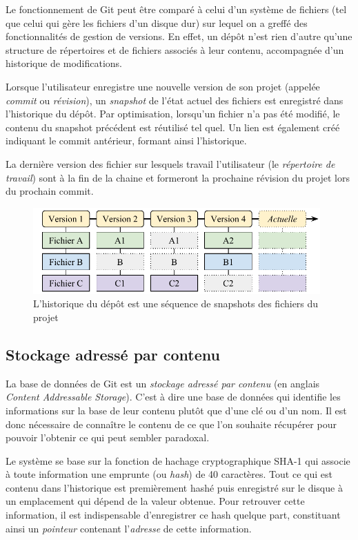 \documentclass[11pt,a4paper]{article}
\begin{document}
Le fonctionnement de Git peut être comparé à celui d'un système de fichiers (tel que celui qui gère les fichiers d'un disque dur) sur lequel on a greffé des fonctionnalités de gestion de versions.
En effet, un dépôt n'est rien d'autre qu'une structure de répertoires et de fichiers associés à leur contenu, accompagnée d'un historique de modifications.

Lorsque l'utilisateur enregistre une nouvelle version de son projet (appelée \textit{commit} ou \textit{révision}), un \textit{snapshot} de l'état actuel des fichiers est enregistré dans l'historique du dépôt.
Par optimisation, lorsqu'un fichier n'a pas été modifié, le contenu du snapshot précédent est réutilisé tel quel. Un lien est également créé indiquant le commit antérieur, formant ainsi l'historique.

La dernière version des fichier sur lesquels travail l'utilisateur (le \textit{répertoire de travail}) sont à la fin de la chaine et formeront la prochaine révision du projet lors du prochain commit.

\begin{figure}[ht]
\begin{center}
\includegraphics[width=11cm]{img_snapshots}
\caption{L'historique du dépôt est une séquence de snapshots des fichiers du projet}
\end{center}
\end{figure}

\subsection{Stockage adressé par contenu}

La base de données de Git est un \textit{stockage adressé par contenu} (en anglais \textit{Content Addressable Storage}). C'est à dire une base de données qui identifie les informations sur la base de leur contenu plutôt que d'une clé ou d'un nom.
Il est donc nécessaire de connaître le contenu de ce que l'on souhaite récupérer pour pouvoir l'obtenir ce qui peut sembler paradoxal.

Le système se base sur la fonction de hachage cryptographique SHA-1 qui associe à toute information une emprunte (ou \textit{hash}) de 40 caractères.
Tout ce qui est contenu dans l'historique est premièrement hashé puis enregistré sur le disque à un emplacement qui dépend de la valeur obtenue.
Pour retrouver cette information, il est indispensable d'enregistrer ce hash quelque part, constituant ainsi un \textit{pointeur} contenant l'\textit{adresse} de cette information.
\end{document}
